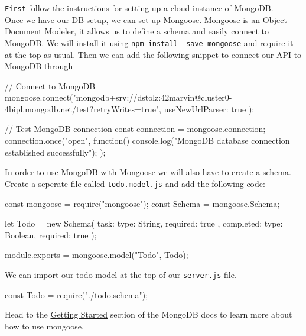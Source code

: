 \documentclass{42-en}
\begin{document}
\texttt{First} follow the instructions for setting up a cloud instance of MongoDB.\\

Once we have our DB setup, we can set up Mongoose. Mongoose is an Object Document Modeler, it allows us to define a schema and easily connect to MongoDB. We will install it using \texttt{npm install --save mongoose} and require it at the top as usual. Then we can add the following snippet to connect our API to MongoDB through 

\begin{42jscode}
// Connect to MongoDB
mongoose.connect("mongodb+srv://dstolz:42marvin@cluster0-4bipl.mongodb.net/test?retryWrites=true",
	{ useNewUrlParser: true }
);

// Test MongoDB connection
const connection = mongoose.connection;
connection.once("open", function() {
	console.log("MongoDB database connection established successfully");
});
\end{42jscode}

In order to use MongoDB with Mongoose we will also have to create a schema. Create a seperate file called \texttt{todo.model.js} and add the following code:

\begin{42jscode}
const mongoose = require("mongoose");
const Schema = mongoose.Schema;

let Todo = new Schema({
  task: {
    type: String,
    required: true
  },
  completed: {
    type: Boolean,
    required: true
  }
});

module.exports = mongoose.model("Todo", Todo);
\end{42jscode}

We can import our todo model at the top of our \texttt{server.js} file.
\begin{42jscode}
const Todo = require("./todo.schema");
\end{42jscode}

\newpage

Head to the \href{https://mongoosejs.com/docs/index.html}{Getting Started} section of the MongoDB docs to learn more about how to use mongoose.


\newpage

\end{document}
